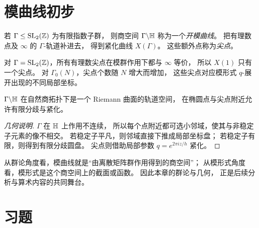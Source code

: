 \section{模曲线初步}
\begin{definition}
若 $\Gamma\le \mathrm{SL}_2(\mathbb{Z})$ 为有限指数子群，
则商空间 $\Gamma\backslash\mathbb{H}$ 称为一个\emph{开模曲线}。
把有理数点及 $\infty$ 的 $\Gamma$-轨道补进去，
得到紧化曲线 $X(\Gamma)$。
这些额外点称为\emph{尖点}。
\end{definition}
\begin{example}
对 $\Gamma=\mathrm{SL}_2(\mathbb{Z})$，所有有理数尖点在模群作用下都与 $\infty$ 等价，
所以 $X(1)$ 只有一个尖点。
对 $\Gamma_0(N)$，尖点个数随 $N$ 增大而增加，
这些尖点对应模形式 $q$-展开出现的不同局部坐标。
\end{example}
\begin{proposition}
$\Gamma\backslash\mathbb{H}$ 在自然商拓扑下是一个 Riemann 曲面的轨道空间，
在椭圆点与尖点附近允许有限分歧与紧化。
\end{proposition}
\begin{proof}[几何说明]
$\Gamma$ 在 $\mathbb{H}$ 上作用不连续，
所以每个点附近都可选小邻域，使其与非稳定子元素的像不相交。
若稳定子平凡，则邻域直接下推成局部坐标盘；
若稳定子有限，则得到有限分歧圆盘。
尖点则借助局部参数 $q=e^{2\pi iz/h}$ 紧化。
\end{proof}
\begin{remark}
从群论角度看，模曲线就是“由离散矩阵群作用得到的商空间”；
从模形式角度看，模形式是这个商空间上的截面或函数。
因此本章的群论与几何，
正是后续分析与算术内容的共同舞台。
\end{remark}
\section*{习题}
